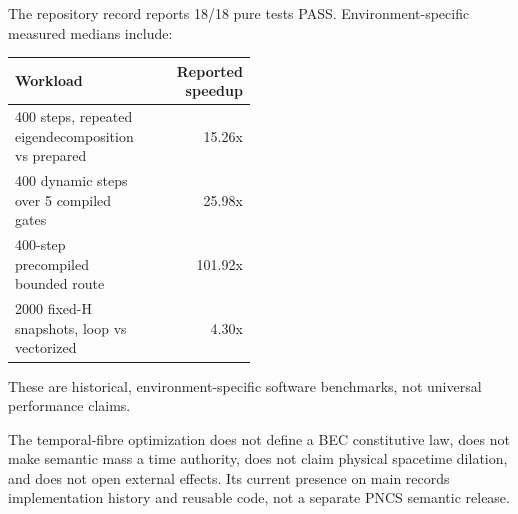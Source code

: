 The repository record reports 18/18 pure tests PASS. Environment-specific measured medians include:
\begin{longtable}{p{0.48\linewidth}r}
\toprule
Workload & Reported speedup\\\midrule
400 steps, repeated eigendecomposition vs prepared & 15.26x\\
400 dynamic steps over 5 compiled gates & 25.98x\\
400-step precompiled bounded route & 101.92x\\
2000 fixed-H snapshots, loop vs vectorized & 4.30x\\\bottomrule
\end{longtable}
These are historical, environment-specific software benchmarks, not universal performance claims.

\begin{boundarybox}
The temporal-fibre optimization does not define a BEC constitutive law, does not make semantic mass a time authority, does not claim physical spacetime dilation, and does not open external effects. Its current presence on main records implementation history and reusable code, not a separate PNCS semantic release.
\end{boundarybox}

